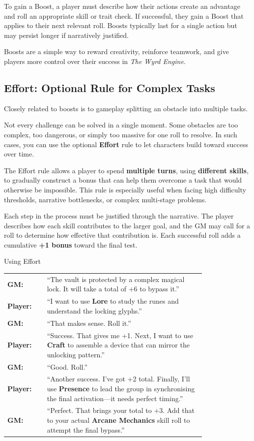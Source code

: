 \begin{multicols}{2}
To gain a Boost, a player must describe how their actions create an advantage and roll an appropriate skill or trait check. If successful, they gain a Boost that applies to their next relevant roll. Boosts typically last for a single action but may persist longer if narratively justified.  

Boosts are a simple way to reward creativity, reinforce teamwork, and give players more control over their success in \textit{The Wyrd Engine}.

\subsection{Effort: Optional Rule for Complex Tasks}

Closely related to boosts is to gameplay splitting an obstacle into multiple tasks.

Not every challenge can be solved in a single moment. Some obstacles are too complex, too dangerous, or simply too massive for one roll to resolve. In such cases, you can use the optional \textbf{Effort} rule to let characters build toward success over time.

The Effort rule allows a player to spend \textbf{multiple turns}, using \textbf{different skills}, to gradually construct a bonus that can help them overcome a task that would otherwise be impossible. This rule is especially useful when facing high difficulty thresholds, narrative bottlenecks, or complex multi-stage problems.

Each step in the process must be justified through the narrative. The player describes how each skill contributes to the larger goal, and the GM may call for a roll to determine how effective that contribution is. Each successful roll adds a cumulative \textbf{+1 bonus} toward the final test.

\begin{Example}{Using Effort}
    \begin{tabular}{@{}l p{0.8\linewidth}@{}}
        \textbf{GM:} & “The vault is protected by a complex magical lock. It will take a total of +6 to bypass it.” \\
        \textbf{Player:} & “I want to use \textbf{Lore} to study the runes and understand the locking glyphs.” \\
        \textbf{GM:} & “That makes sense. Roll it.” \\
        \textbf{Player:} & “Success. That gives me +1. Next, I want to use \textbf{Craft} to assemble a device that can mirror the unlocking pattern.” \\
        \textbf{GM:} & “Good. Roll.” \\
        \textbf{Player:} & “Another success. I’ve got +2 total. Finally, I’ll use \textbf{Presence} to lead the group in synchronising the final activation—it needs perfect timing.” \\
        \textbf{GM:} & “Perfect. That brings your total to +3. Add that to your actual \textbf{Arcane Mechanics} skill roll to attempt the final bypass.”
    \end{tabular}
\end{Example}


\end{multicols}
